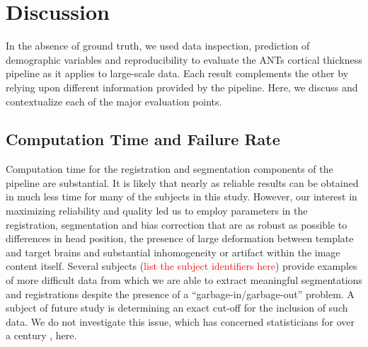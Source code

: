 \section{Discussion}
In the absence of ground truth, we used data inspection, prediction of
demographic variables and reproducibility to evaluate the ANTs
cortical thickness pipeline as it applies to large-scale data.  Each
result complements the other by relying upon different information
provided by the pipeline.  Here, we discuss and contextualize each of
the major evaluation points. 

\subsection{Computation Time and Failure Rate}
Computation time for the registration and segmentation components of
the pipeline are substantial.  It is likely that nearly as reliable
results can be obtained in much less time for many of the subjects in
this study.  However, our interest in
maximizing reliability and quality led us to employ parameters in the
registration, segmentation and bias correction that are as robust as
possible to differences in head position, the presence of large
deformation between template and target brains and substantial
inhomogeneity or artifact within the image content itself.  Several
subjects (\textcolor{red}{list the subject identifiers here})
provide examples of more difficult data from which we are able to
extract meaningful segmentations and registrations despite the presence of a
``garbage-in/garbage-out'' problem.  A subject of future study is
determining an exact cut-off for the inclusion of such data.  We do not
investigate this issue, which has concerned statisticians for over a
century \cite{oldreferenceonrobuststatistics}, here. 

